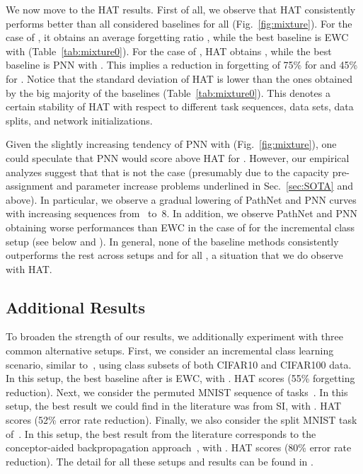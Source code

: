 We now move to the HAT results. First of all, we observe that HAT consistently performs better than all considered baselines for all  (Fig.~\ref{fig:mixture}). For the case of , it obtains an average forgetting ratio , while the best baseline is EWC with  (Table~\ref{tab:mixture0}). For the case of , HAT obtains , while the best baseline is PNN with . This implies a reduction in forgetting of 75\% for  and 45\% for . Notice that the standard deviation of HAT is lower than the ones obtained by the big majority of the baselines (Table~\ref{tab:mixture0}). This denotes a certain stability of HAT with respect to different task sequences, data sets, data splits, and network initializations. 

Given the slightly increasing tendency of PNN with  (Fig.~\ref{fig:mixture}), one could speculate that PNN would score above HAT for . However, our empirical analyzes suggest that that is not the case (presumably due to the capacity pre-assignment and parameter increase problems underlined in Sec.~\ref{sec:SOTA} and above). In particular, we observe a gradual lowering of PathNet and PNN curves with increasing sequences from ~to~8. In addition, we observe PathNet and PNN obtaining worse performances than EWC in the case of  for the incremental class setup (see below and ). In general, none of the baseline methods consistently outperforms the rest across setups and for all , a situation that we do observe with HAT. 

\subsection{Additional Results}
\label{sec:Exper_Addition}

To broaden the strength of our results, we additionally experiment with three common alternative setups. First, we consider an incremental class learning scenario, similar to~\citet{LopezPaz17NIPS}, using class subsets of both CIFAR10 and CIFAR100 data. In this setup, the best baseline after  is EWC, with . HAT scores  (55\% forgetting reduction). Next, we consider the permuted MNIST sequence of tasks~\cite{Srivastava13NIPS}. In this setup, the best result we could find in the literature was from SI, with . HAT scores  (52\% error rate reduction). Finally, we also consider the split MNIST task of~\citet{Lee17NIPS}. In this setup, the best result from the literature corresponds to the conceptor-aided backpropagation approach~\cite{He18ICLR}, with . HAT scores  (80\% error rate reduction). The detail for all these setups and results can be found in .

